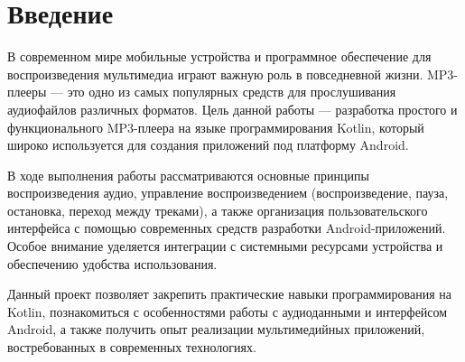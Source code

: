 \chapter*{Введение}
\label{ch:intro}

В современном мире мобильные устройства и программное обеспечение для воспроизведения мультимедиа играют важную роль в повседневной жизни. MP3-плееры — это одно из самых популярных средств для прослушивания аудиофайлов различных форматов. Цель данной работы — разработка простого и функционального MP3-плеера на языке программирования Kotlin, который широко используется для создания приложений под платформу Android.

В ходе выполнения работы рассматриваются основные принципы воспроизведения аудио, управление воспроизведением (воспроизведение, пауза, остановка, переход между треками), а также организация пользовательского интерфейса с помощью современных средств разработки Android-приложений. Особое внимание уделяется интеграции с системными ресурсами устройства и обеспечению удобства использования.

Данный проект позволяет закрепить практические навыки программирования на Kotlin, познакомиться с особенностями работы с аудиоданными и интерфейсом Android, а также получить опыт реализации мультимедийных приложений, востребованных в современных технологиях.
